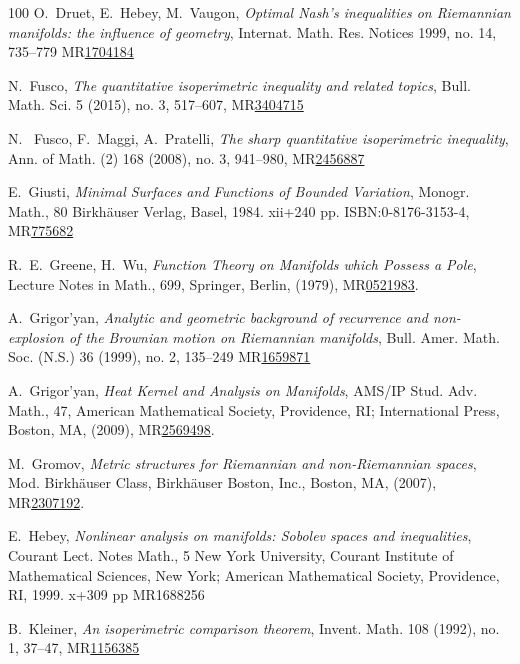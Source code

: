 \documentclass[a4paper,11pt,reqno]{amsart}
\theoremstyle{plain}
\numberwithin{equation}{section} \allowdisplaybreaks
\begin{document}
\begin{thebibliography}{100}
 O.~Druet, E.~Hebey, M.~Vaugon, \emph{ Optimal Nash’s inequalities on Riemannian manifolds: the
influence of geometry}, Internat. Math. Res. Notices 1999, no. 14, 735–779 MR\href{https://doi.org/10.1155/S1073792899000380}{1704184}


 N.~Fusco, \emph{The quantitative isoperimetric inequality and related topics}, Bull. Math. Sci. 5 (2015), no. 3, 517–607, MR\href{https://doi.org/10.1007/s13373-015-0074-x}{3404715}



 N.~ Fusco, F.~Maggi, A.~Pratelli, \emph{The sharp quantitative isoperimetric inequality}, Ann. of Math. (2) 168 (2008), no. 3, 941–980, MR\href{https://doi.org/10.4007/annals.2008.168.941}{2456887}

 E.~Giusti, \emph{Minimal Surfaces and Functions of Bounded Variation}, Monogr. Math., 80
Birkhäuser Verlag, Basel, 1984. xii+240 pp.
ISBN:0-8176-3153-4, MR\href{https://doi.org/10.1007/978-1-4684-9486-0}{775682}

 R.~E.~Greene, H.~Wu, \emph{Function Theory on Manifolds which Possess a Pole}, Lecture Notes in Math., 699, Springer, Berlin, (1979), MR\href{https://doi.org/10.1007/BFb0063413}{0521983}.

 A.~Grigor'yan, \emph{Analytic and geometric background of recurrence and non-explosion of the Brownian motion on Riemannian manifolds}, Bull. Amer. Math. Soc. (N.S.) 36 (1999), no. 2, 135–249 MR\href{https://doi.org/10.1090/S0273-0979-99-00776-4}{1659871}

  A.~Grigor’yan, \emph{Heat Kernel and Analysis on Manifolds}, AMS/IP Stud. Adv. Math., 47, American Mathematical Society, Providence, RI; International Press, Boston, MA, (2009), MR\href{https://doi.org/10.1090/amsip/047}{2569498}.

 M.~Gromov, \textit{Metric structures for Riemannian and non-Riemannian spaces}, Mod. Birkhäuser Class, Birkhäuser Boston, Inc., Boston, MA, (2007), MR\href{https://mathscinet.ams.org/mathscinet/article?mr=682063}{2307192}.

 E.~Hebey, \emph{Nonlinear analysis on manifolds: Sobolev spaces and inequalities}, Courant Lect. Notes Math., 5 New York University, Courant Institute of Mathematical Sciences, New York; American Mathematical Society, Providence, RI, 1999. x+309 pp MR{1688256}

 B.~Kleiner, \emph{An isoperimetric comparison theorem}, Invent. Math. 108 (1992), no. 1, 37–47, MR\href{https://doi.org/10.1007/BF02100598}{1156385}




\end{thebibliography}
\end{document}
